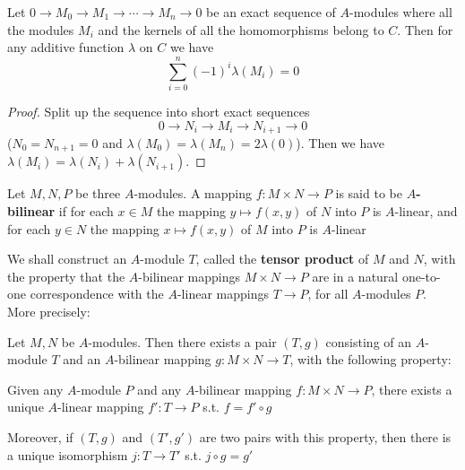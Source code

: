 \documentclass[11pt]{article}
\begin{document}
\begin{proposition}[]
Let \(0\to M_0\to M_1\to\cdots\to M_n\to 0\) be an exact sequence of \(A\)-modules where all the modules \(M_i\)
and the kernels of all the homomorphisms belong to \(C\). Then for any additive function \(\lambda\)
on \(C\) we have
\begin{equation*}
\sum_{i=0}^n(-1)^i\lambda(M_i)=0
\end{equation*}
\end{proposition}

\begin{proof}
Split up the sequence into short exact sequences
\begin{equation*}
0\to N_i\to M_i\to N_{i+1}\to 0
\end{equation*}
(\(N_0=N_{n+1}=0\) and \(\lambda(M_0)=\lambda(M_n)=2\lambda(0)\)). Then we have \(\lambda(M_i)=\lambda(N_i)+\lambda(N_{i+1})\).
\end{proof}

Let \(M,N,P\) be three \(A\)-modules. A mapping \(f:M\times N\to P\) is said to be \textbf{\(A\)-bilinear} if
for each \(x\in M\) the mapping \(y\mapsto f(x,y)\) of \(N\) into \(P\) is \(A\)-linear, and for
each \(y\in N\) the mapping \(x\mapsto f(x,y)\) of \(M\) into \(P\) is \(A\)-linear

We shall construct an \(A\)-module \(T\), called the \textbf{tensor product} of \(M\) and \(N\), with the
property that the \(A\)-bilinear mappings \(M\times N\to P\) are in a natural one-to-one correspondence
with the \(A\)-linear mappings \(T\to P\), for all \(A\)-modules \(P\). More precisely:

\begin{proposition}[]
Let \(M,N\) be \(A\)-modules. Then there exists a pair \((T,g)\) consisting of
an \(A\)-module \(T\) and an \(A\)-bilinear mapping \(g:M\times N\to T\), with the following property:

Given any \(A\)-module \(P\) and any \(A\)-bilinear mapping \(f:M\times N\to P\), there exists a
unique \(A\)-linear mapping \(f':T\to P\) s.t. \(f=f'\circ g\)

Moreover, if \((T,g)\) and \((T',g')\) are two pairs with this property, then there is a unique
isomorphism \(j:T\to T'\) s.t. \(j\circ g=g'\)
\end{proposition}
\end{document}
